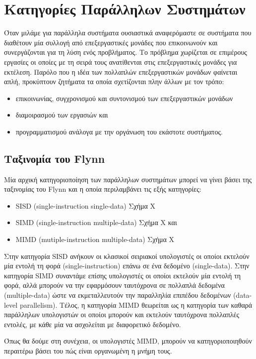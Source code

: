 \section{Κατηγορίες Παράλληλων Συστημάτων}
\label{sec:Parallel System Categories}
Όταν μιλάμε για παράλληλα συστήματα ουσιαστικά αναφερόμαστε σε συστήματα που διαθέτουν μία συλλογή από επεξεργαστικές μονάδες που επικοινωνούν και συνεργάζονται για τη λύση ενός προβλήματος. Το πρόβλημα χωρίζεται σε επιμέρους εργασίες οι οποίες με τη σειρά τους ανατίθενται στις επεξεργαστικές μονάδες για εκτέλεση. Παρόλο που η ιδέα των πολλαπλών επεξεργαστικών μονάδων φαίνεται απλή, προκύπτουν ζητήματα τα οποία σχετίζονται πλην άλλων με τον τρόπο:
\begin{itemize}
	\item επικοινωνίας, συγχρονισμού και συντονισμού των επεξεργαστικών μονάδων
	\item διαμοιρασμού των εργασιών και
	\item προγραμματισμού ανάλογα με την οργάνωση του εκάστοτε συστήματος.
\end{itemize}
 
\subsection{Ταξινομία του Flynn}
Μία αρχική κατηγοριοποίηση των παράλληλων συστημάτων μπορεί να γίνει βάσει της ταξινομίας του Flynn και η οποία περιλαμβάνει τις εξής κατηγορίες:
\begin{itemize}
	\item SISD (single-instruction single-data) Σχήμα Χ
	\item SIMD (single-instruction multiple-data) Σχήμα Χ και
	\item MIMD (mutiple-instruction multiple-data) Σχήμα Χ
\end{itemize}

Στην κατηγορία SISD ανήκουν οι κλασικοί σειριακοί υπολογιστές οι οποίοι εκτελούν μία εντολή τη φορά (single-instruction) επάνω σε ένα δεδομένο (single-data). Στην κατηγορία SIMD συναντάμε επίσης υπολογιστές οι οποίοι εκτελούν μία εντολή τη φορά, αλλά μπορούν να την εφαρμόσουν ταυτόχρονα σε πολλαπλά δεδομένα (multiple-data) ώστε να εκμεταλλευτούν την παραλληλία επιπέδου δεδομένων (data-level parallelism). Τέλος, η κατηγορία MIMD θεωρείται ως η κατηγορία των καθαρά παράλληλων υπολογιστών οι οποίοι μπορούν και εκτελούν ταυτόχρονα πολλαπλές εντολές, με κάθε μία να ασχολείται με διαφορετικό δεδομένο.

Όπως θα δούμε στη συνέχεια, οι υπολογιστές MIMD, μπορούν να κατηγοριοποιηθούν περαιτέρω βάσει του πώς είναι οργανωμένη η μνήμη τους.

